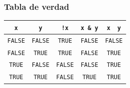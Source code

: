 \documentclass[
  spanish,
  a4paper,
]{scrreport}
\newcounter{none} %
\theoremstyle{definition}
\theoremstyle{definition}
\theoremstyle{remark}
\begin{document}
\subsubsection*{Tabla de verdad}\label{tabla-de-verdad}

{\def\LTcaptype{none} %
\begin{longtable}[]{@{}ccccc@{}}
\toprule\noalign{}
\texttt{x} & \texttt{y} & \texttt{!x} & \texttt{x\ \&\ y} &
\texttt{x\ \textbar{}\ y} \\
\midrule\noalign{}
\endhead
\bottomrule\noalign{}
\endlastfoot
\texttt{FALSE} & \texttt{FALSE} & \texttt{TRUE} & \texttt{FALSE} &
\texttt{FALSE} \\
\texttt{FALSE} & \texttt{TRUE} & \texttt{TRUE} & \texttt{FALSE} &
\texttt{TRUE} \\
\texttt{TRUE} & \texttt{FALSE} & \texttt{FALSE} & \texttt{FALSE} &
\texttt{TRUE} \\
\texttt{TRUE} & \texttt{TRUE} & \texttt{FALSE} & \texttt{TRUE} &
\texttt{TRUE} \\
\end{longtable}
}
\end{document}

